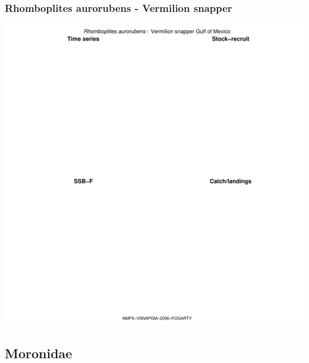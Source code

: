 \subsubsection{Rhomboplites aurorubens - Vermilion snapper}
\begin{center}
\includegraphics[width=1.2\textwidth]{../R/figures/NMFS-VSNAPGM-2006-FOGARTY.pdf}
\end{center}

\subsection{Moronidae}

